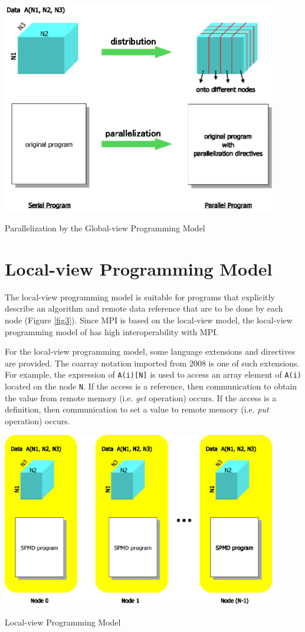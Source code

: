 \begin{myfigure}
\includegraphics[width=12cm]{figs/Fig2.eps}
  \caption{Parallelization by the Global-view Programming Model}
\label{fig2}
\end{myfigure}

\section{Local-view Programming Model}

The local-view programming model is suitable for programs that
explicitly describe an algorithm and remote data reference that are to
be done by each node (Figure \ref{fig3}). Since MPI is 
based on the local-view model, the local-view programming model of
{\XMP} has high interoperability with MPI.

For the local-view programming model, some language extensions and 
directives are provided. The coarray notation imported from {\Fort} 2008
is one of such extensions. For example, the expression of {\tt A(i)[N]}
is used to access an array element of {\tt A(i)} located on the node
{\tt N}.
%
If the access is a reference, then communication to obtain the value
from remote memory (i.e. {\it get} operation) occurs. If the access is a
definition, then communication to set a value to remote memory
(i.e. {\it put} operation) occurs.

\begin{myfigure}
\includegraphics[width=12cm]{figs/Fig3.eps}
  \caption{Local-view Programming Model}
\label{fig3}
\end{myfigure}

